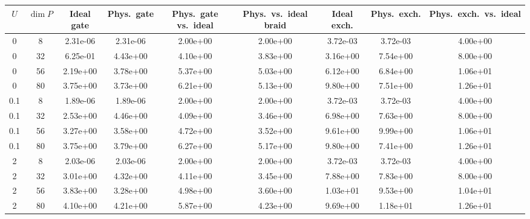 \begin{tabular}{ccccccccc}
\hline
$U$ & $\dim P$ & Ideal gate & Phys.\ gate & Phys.\ gate vs.\ ideal & Phys.\ vs.\ ideal braid & Ideal exch. & Phys.\ exch. & Phys.\ exch.\ vs.\ ideal \\
\hline
0 & 8 & 2.31e-06 & 2.31e-06 & 2.00e+00 & 2.00e+00 & 3.72e-03 & 3.72e-03 & 4.00e+00 \\
0 & 32 & 6.25e-01 & 4.43e+00 & 4.10e+00 & 3.83e+00 & 3.16e+00 & 7.54e+00 & 8.00e+00 \\
0 & 56 & 2.19e+00 & 3.78e+00 & 5.37e+00 & 5.03e+00 & 6.12e+00 & 6.84e+00 & 1.06e+01 \\
0 & 80 & 3.75e+00 & 3.73e+00 & 6.21e+00 & 5.13e+00 & 9.80e+00 & 7.51e+00 & 1.26e+01 \\
\hline
0.1 & 8 & 1.89e-06 & 1.89e-06 & 2.00e+00 & 2.00e+00 & 3.72e-03 & 3.72e-03 & 4.00e+00 \\
0.1 & 32 & 2.53e+00 & 4.46e+00 & 4.09e+00 & 3.46e+00 & 6.98e+00 & 7.63e+00 & 8.00e+00 \\
0.1 & 56 & 3.27e+00 & 3.58e+00 & 4.72e+00 & 3.52e+00 & 9.61e+00 & 9.99e+00 & 1.06e+01 \\
0.1 & 80 & 3.75e+00 & 3.79e+00 & 6.27e+00 & 5.17e+00 & 9.80e+00 & 7.41e+00 & 1.26e+01 \\
\hline
2 & 8 & 2.03e-06 & 2.03e-06 & 2.00e+00 & 2.00e+00 & 3.72e-03 & 3.72e-03 & 4.00e+00 \\
2 & 32 & 3.01e+00 & 4.32e+00 & 4.11e+00 & 3.45e+00 & 7.88e+00 & 7.83e+00 & 8.00e+00 \\
2 & 56 & 3.83e+00 & 3.28e+00 & 4.98e+00 & 3.60e+00 & 1.03e+01 & 9.53e+00 & 1.04e+01 \\
2 & 80 & 4.10e+00 & 4.21e+00 & 5.87e+00 & 4.23e+00 & 9.69e+00 & 1.18e+01 & 1.26e+01 \\
\hline
\end{tabular}
